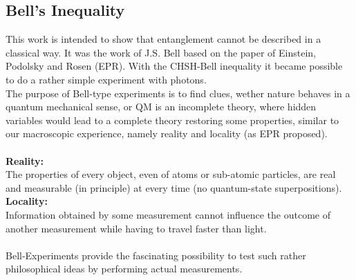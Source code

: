 \documentclass[12pt,a4paper]{article}
\begin{document}
\begin{multicols}{2}

%

\section{Bell's Inequality}
This work is intended to show that entanglement cannot be described in a classical way. It was the work of J.S. Bell based on the paper of Einstein, Podolsky and Rosen (EPR). With the CHSH-Bell inequality it became possible to do a rather simple experiment with photons.\\
The purpose of Bell-type experiments is to find clues, wether nature behaves in a quantum mechanical sense, or QM is an incomplete theory, where hidden variables would lead to a complete theory restoring some properties, similar to our macroscopic experience, namely  reality and locality (as EPR proposed).\\
\\
\textbf{Reality:}\\ The properties of every object, even of atoms or sub-atomic particles, are real and measurable (in principle) at every time (no quantum-state superpositions).\\
\textbf{Locality:}\\
Information obtained by some measurement cannot influence the outcome of another measurement while having to travel faster than light.\\
\\
Bell-Experiments provide the fascinating possibility to test such rather philosophical ideas by performing actual measurements.


\end{multicols}
\end{document}

